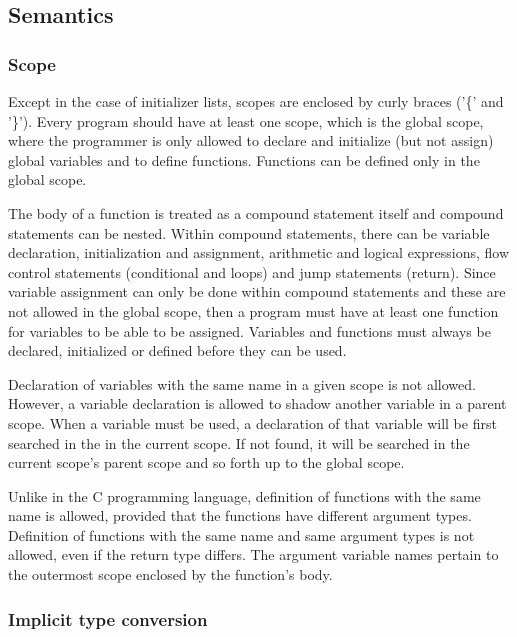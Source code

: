 \subsection{Semantics}
\label{section:semantics}

\subsubsection{Scope}

Except in the case of initializer lists, scopes are enclosed by curly
braces ('\{' and '\}'). Every program should have at least one scope,
which is the global scope, where the programmer is only allowed to
declare and initialize (but not assign) global variables and to
define functions. Functions can be defined only in the global scope.

The body of a function is treated as a compound statement itself 
and compound statements can be nested. Within compound statements,
there can be variable declaration, initialization and assignment,
arithmetic and logical expressions, flow control statements
(conditional and loops) and jump statements (return).
Since variable assignment can only be done within compound statements
and these are not allowed in the global scope, then a program must
have at least one function for variables to be able to be assigned.
Variables and functions must always be declared, initialized or defined 
before they can be used.

Declaration of variables with the same name in a given scope is
not allowed. However, a variable declaration is allowed to shadow
another variable in a parent scope. When a variable must be used,
a declaration of that variable will be first searched in the
in the current scope. If not found, it will be searched in the
current scope's parent scope and so forth up to the global scope.

Unlike in the C programming language, definition of functions with
the same name is allowed, provided that the functions have different
argument types. Definition of functions with the same name and same
argument types is not allowed, even if the return type differs.
The argument variable names pertain to the outermost scope enclosed
by the function's body.



\subsubsection{Implicit type conversion}
\label{section:types}

